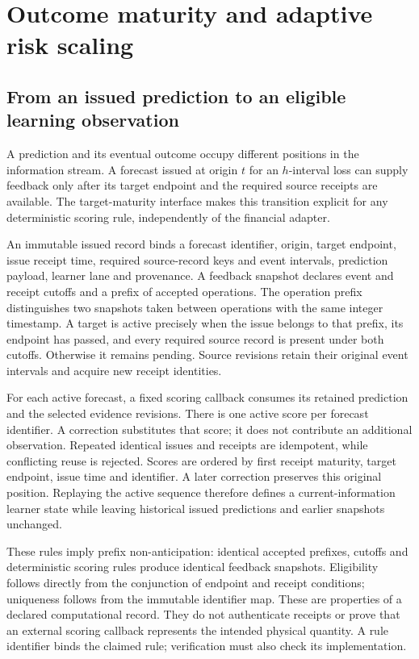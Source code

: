 \documentclass[11pt,a4paper]{article}
\theoremstyle{definition}\newtheorem{definition}[theorem]{Definition}
\begin{document}
\section{Outcome maturity and adaptive risk scaling}\label{sec:adaptive}
\subsection{From an issued prediction to an eligible learning observation}
A prediction and its eventual outcome occupy different positions in the information stream. A forecast issued at origin $t$ for an $h$-interval loss can supply feedback only after its target endpoint and the required source receipts are available. The target-maturity interface makes this transition explicit for any deterministic scoring rule, independently of the financial adapter.

An immutable issued record binds a forecast identifier, origin, target endpoint, issue receipt time, required source-record keys and event intervals, prediction payload, learner lane and provenance. A feedback snapshot declares event and receipt cutoffs and a prefix of accepted operations. The operation prefix distinguishes two snapshots taken between operations with the same integer timestamp. A target is active precisely when the issue belongs to that prefix, its endpoint has passed, and every required source record is present under both cutoffs. Otherwise it remains pending. Source revisions retain their original event intervals and acquire new receipt identities.

For each active forecast, a fixed scoring callback consumes its retained prediction and the selected evidence revisions. There is one active score per forecast identifier. A correction substitutes that score; it does not contribute an additional observation. Repeated identical issues and receipts are idempotent, while conflicting reuse is rejected. Scores are ordered by first receipt maturity, target endpoint, issue time and identifier. A later correction preserves this original position. Replaying the active sequence therefore defines a current-information learner state while leaving historical issued predictions and earlier snapshots unchanged.

These rules imply prefix non-anticipation: identical accepted prefixes, cutoffs and deterministic scoring rules produce identical feedback snapshots. Eligibility follows directly from the conjunction of endpoint and receipt conditions; uniqueness follows from the immutable identifier map. These are properties of a declared computational record. They do not authenticate receipts or prove that an external scoring callback represents the intended physical quantity. A rule identifier binds the claimed rule; verification must also check its implementation.
\end{document}
